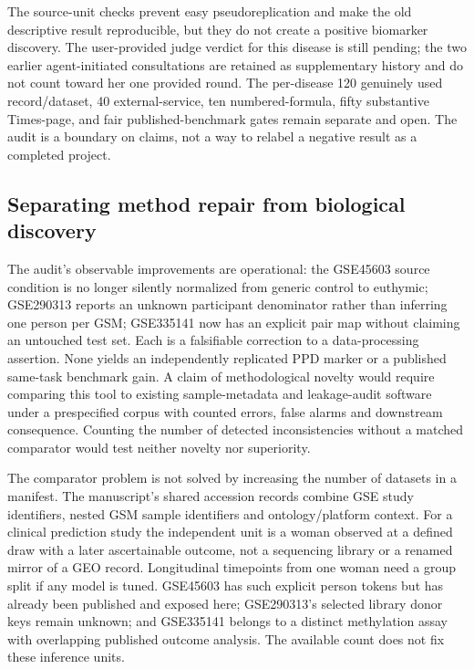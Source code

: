 \documentclass[11pt,a4paper]{article}
\begin{document}
The source-unit checks prevent easy pseudoreplication and make the old descriptive result reproducible, but they do not create a positive biomarker discovery. The user-provided judge verdict for this disease is still pending; the two earlier agent-initiated consultations are retained as supplementary history and do not count toward her one provided round. The per-disease 120 genuinely used record/dataset, 40 external-service, ten numbered-formula, fifty substantive Times-page, and fair published-benchmark gates remain separate and open. The audit is a boundary on claims, not a way to relabel a negative result as a completed project.


\subsection{Separating method repair from biological discovery}
The audit's observable improvements are operational: the GSE45603 source condition is no longer silently normalized from generic control to euthymic; GSE290313 reports an unknown participant denominator rather than inferring one person per GSM; GSE335141 now has an explicit pair map without claiming an untouched test set. Each is a falsifiable correction to a data-processing assertion. None yields an independently replicated PPD marker or a published same-task benchmark gain. A claim of methodological novelty would require comparing this tool to existing sample-metadata and leakage-audit software under a prespecified corpus with counted errors, false alarms and downstream consequence. Counting the number of detected inconsistencies without a matched comparator would test neither novelty nor superiority.

The comparator problem is not solved by increasing the number of datasets in a manifest. The manuscript's shared accession records combine GSE study identifiers, nested GSM sample identifiers and ontology/platform context. For a clinical prediction study the independent unit is a woman observed at a defined draw with a later ascertainable outcome, not a sequencing library or a renamed mirror of a GEO record. Longitudinal timepoints from one woman need a group split if any model is tuned. GSE45603 has such explicit person tokens but has already been published and exposed here; GSE290313's selected library donor keys remain unknown; and GSE335141 belongs to a distinct methylation assay with overlapping published outcome analysis. The available count does not fix these inference units.
\end{document}

